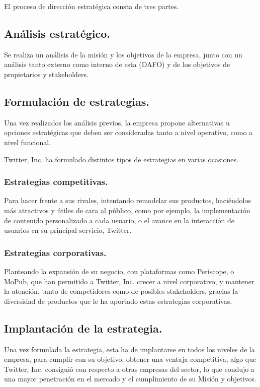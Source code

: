 El proceso de dirección estratégica consta de tres partes.

\subsection{Análisis estratégico.}

Se realiza un análisis de la misión y los objetivos de la empresa, junto con un análisis tanto externo como interno de esta (DAFO) y de los objetivos de propietarios y stakeholders.

\subsection{Formulación de estrategias.}

Una vez realizados los análisis previos, la empresa propone alternativas u opciones estratégicas  que deben ser consideradas tanto a nivel operativo, como a nivel funcional.

Twitter, Inc. ha formulado distintos tipos de estrategias en varias ocasiones.

\subsubsection{Estrategias competitivas.}

Para hacer frente a sus rivales, intentando remodelar sus productos, haciéndolos más atractivos y útiles de cara al público, como por ejemplo, la implementación de contenido personalizado a cada usuario, o el avance en la interacción de usuarios en su principal servicio, Twitter.

\subsubsection{Estrategias corporativas.}

Planteando la expansión de su negocio, con plataformas como Periscope, o MoPub, que han permitido a Twitter, Inc. crecer a nivel corporativo, y mantener la atención, tanto de competidores como de posibles stakeholders, gracias la diversidad de productos que le ha aportado estas estrategias corporativas.

\subsection{Implantación de la estrategia.}

Una vez formulada la estrategia, esta ha de implantarse en todos los niveles de la empresa, para cumplir con su objetivo, obtener una ventaja competitiva, algo que Twitter, Inc. consiguió con respecto a otras empresas del sector, lo que condujo a una mayor penetración en el mercado y el cumplimiento de su Misión y objetivos.


